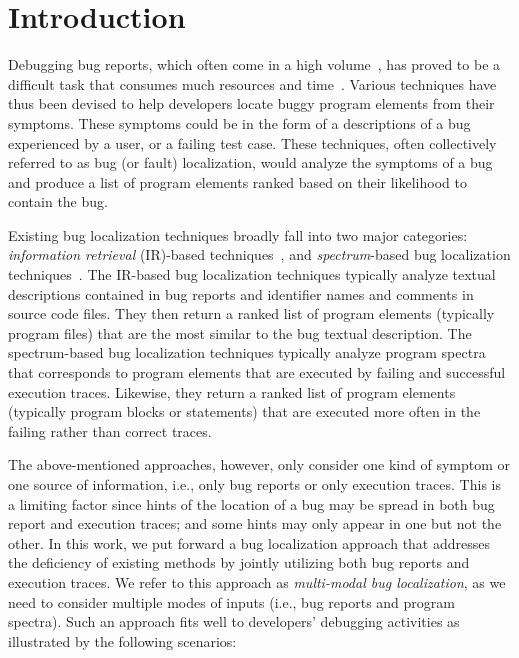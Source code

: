 \section{Introduction}
\label{sec.intro}

Debugging bug reports, which often come in a high volume~\cite{AnvikHM05}, has proved to be a difficult task that consumes much resources and time~\cite{tassey02economic}. Various techniques have thus been devised to help developers locate buggy program elements from their symptoms. These symptoms could be in the form of a descriptions of a bug experienced by a user, or a failing test case. These techniques, often collectively referred to as bug (or fault) localization, would analyze the symptoms of a bug and produce a list of program elements ranked based on their likelihood to contain the bug.

Existing bug localization techniques broadly fall into two major categories: \emph{information retrieval} (IR)-based techniques~\cite{Rao:2011:RSL:1985441.1985451,Sisman:2012:IVH:2664446.2664454,Zhou:2012:BFM:2337223.2337226,SahaLKP13}, and \emph{spectrum}-based bug localization techniques~\cite{JH05,Abreu:2009,RR03,ZH02,Zeller2002a,CZ05,LAZJ03,Libl+05,LYFHM05}. The IR-based bug localization techniques typically analyze textual descriptions contained in bug reports and identifier names and comments in source code files. They then return a ranked list of program elements (typically program files) that are the most similar to the bug textual description. The spectrum-based bug localization techniques typically analyze program spectra that corresponds to program elements that are executed by failing and successful execution traces. Likewise, they return a ranked list of program elements (typically program blocks or statements) that are executed more often in the failing rather than correct traces.


The above-mentioned approaches, however, only consider one kind of symptom or one source of information, i.e., only bug reports or only execution traces. This is a limiting factor since hints of the location of a bug may be spread in both bug report and execution traces; and some hints may only appear in one but not the other. In this work, we put forward a bug localization approach that addresses the deficiency of existing methods by jointly utilizing both bug reports and execution traces. We refer to this approach as {\em multi-modal bug localization}, as we need to consider multiple modes of inputs (i.e., bug reports and program spectra). Such an approach fits well to developers' debugging activities as illustrated by the following scenarios:

